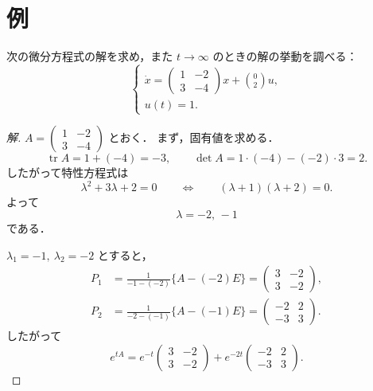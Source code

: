 \documentclass[article,paper=a4paper]{jlreq}
\begin{document}
\section{例}

\begin{ex}
次の微分方程式の解を求め，また $t\to\infty$ のときの解の挙動を調べる：
\[
  \begin{cases}
    \displaystyle
    \dot{x}
      =
      \begin{pmatrix}
        1 & -2\\
        3 & -4
      \end{pmatrix}x
      +
      \binom{0}{2}u,\\[3mm]
    u(t)=1.
  \end{cases}
\]
\end{ex}

\begin{proof}[解]
$A=\begin{pmatrix}1&-2\\3&-4\end{pmatrix}$ とおく．
まず，固有値を求める．
\[
  \operatorname{tr}A=1+(-4)=-3,
  \qquad
  \det A=1\cdot(-4)-(-2)\cdot3=2.
\]
したがって特性方程式は
\[
  \lambda^2+3\lambda+2=0
  \qquad\Longleftrightarrow\qquad
  (\lambda+1)(\lambda+2)=0.
\]
よって
\[
  \lambda=-2,\,-1
\]
である．

$\lambda_1=-1,\ \lambda_2=-2$ とすると，
\begin{align*}
  P_1
    &=
    \frac{1}{-1-(-2)}\{A-(-2)E\}
    =
    \begin{pmatrix}
      3 & -2\\
      3 & -2
    \end{pmatrix},\\
  P_2
    &=
    \frac{1}{-2-(-1)}\{A-(-1)E\}
    =
    \begin{pmatrix}
      -2 & 2\\
      -3 & 3
    \end{pmatrix}.
\end{align*}
したがって
\[
  e^{tA}
    =
    e^{-t}
    \begin{pmatrix}
      3 & -2\\
      3 & -2
    \end{pmatrix}
    +
    e^{-2t}
    \begin{pmatrix}
      -2 & 2\\
      -3 & 3
    \end{pmatrix}.
\]


\end{proof}
\end{document}
